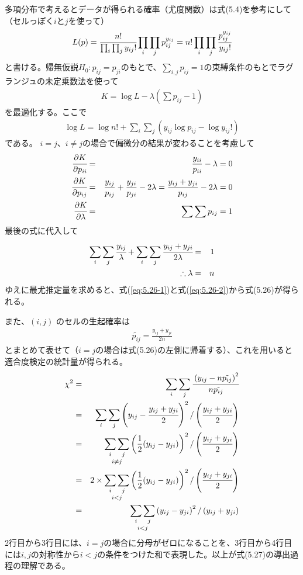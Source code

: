\documentclass[10pt, a4paper]{ltjsarticle}
\newcommand\refeq[1]{式(\ref{#1})}
\begin{document}
多項分布で考えるとデータが得られる確率（尤度関数）は式(5.4)を参考にして（セルっぽく$i$と$j$を使って）
\begin{equation}
  L(p) = \cfrac{n!}{\prod_i\prod_j y_{ij}!} \prod_i\prod_j p_{ij}^{y_{ij}} = n!\prod_i\prod_j \cfrac{p_{ij}^{y_{ij}}}{y_{ij}!}
\end{equation}
と書ける。帰無仮説$H_0:p_{ij}=p_{ji}$のもとで、$\sum_{i,j}p_{ij}=1$の束縛条件のもとでラグランジュの未定乗数法を使って
\begin{eqnarray}
  K = \log L -\lambda \left(\sum p_{ij}-1 \right)
\end{eqnarray}
を最適化する。ここで
\begin{eqnarray}
  \log L = \log n! + \sum_i\sum_j\left(y_{ij}\log p_{ij} - \log y_{ij}! \right) 
\end{eqnarray}
である。
$i=j$、$i\neq j$の場合で偏微分の結果が変わることを考慮して
\begin{eqnarray}
  \cfrac{\partial K}{\partial p_{ii}} &=& \frac{y_{ii}}{p_{ii}} - \lambda = 0 \label{eq:5.26-1}\\
  \cfrac{\partial K}{\partial p_{ij}} &=& \frac{y_{ij}}{p_{ij}} + \frac{y_{ji}}{p_{ji}} - 2\lambda = \frac{y_{ij}+y_{ji}}{p_{ij}} - 2\lambda = 0 \label{eq:5.26-2}\\
  \cfrac{\partial K}{\partial \lambda} &=& \sum\sum p_{ij} = 1
\end{eqnarray}
最後の式に代入して
\begin{eqnarray}
  \sum_i\sum_j \cfrac{y_{ij}}{\lambda} + \sum_i\sum_j \cfrac{y_{ij}+y_{ji}}{2\lambda} &=& 1 \\
  \therefore \lambda &=& n  
\end{eqnarray}
ゆえに最尤推定量を求めると、\refeq{eq:5.26-1}と\refeq{eq:5.26-2}から式(5.26)が得られる。

また、$(i,j)$ のセルの生起確率は
\begin{eqnarray}
  \tilde{p_{ij}} = \frac{y_{ij}+y_{ji}}{2n}
\end{eqnarray}
とまとめて表せて（$i=j$の場合は式(5.26)の左側に帰着する）、これを用いると適合度検定の統計量が得られる。
\begin{eqnarray}
  \chi^2 &=& \sum_i\sum_j\cfrac{\left(y_{ij} - n\tilde{p_{ij}}\right)^2}{n\tilde{p_{ij}}} \\
  &=& \sum_i\sum_j \left( y_{ij} - \cfrac{y_{ij}+y_{ji}}{2} \right)^2/\left(\cfrac{y_{ij}+y_{ji}}{2}\right) \\ 
  &=& \mathop{\sum_i\sum_j}_{i\neq j} \left( \frac{1}{2} (y_{ij} - y_{ji}) \right)^2/\left(\cfrac{y_{ij}+y_{ji}}{2}\right) \\ 
  &=& 2 \times \mathop{\sum_i\sum_j}_{i < j} \left( \frac{1}{2} (y_{ij} - y_{ji}) \right)^2/\left(\cfrac{y_{ij}+y_{ji}}{2}\right) \\ 
  &=& \mathop{\sum_i\sum_j}_{i < j} \left( y_{ij} - y_{ji} \right)^2/\left(y_{ij}+y_{ji}\right) 
\end{eqnarray}
2行目から3行目には、$i=j$の場合に分母がゼロになることを、3行目から4行目には$i,j$の対称性から$i<j$の条件をつけた和で表現した。以上が式(5.27)の導出過程の理解である。
\end{document}
